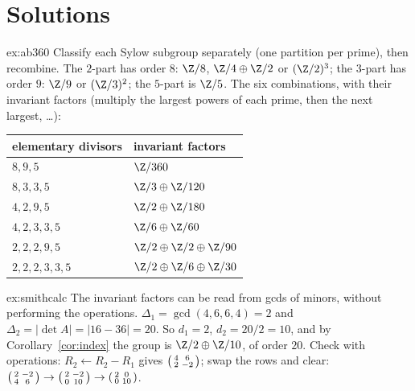 \section{Solutions}

\begin{solution}{ex:ab360}
\idea Classify each Sylow subgroup separately (one partition per prime), then recombine.
\writeup The $2$-part has order $8$: $\Z/8$, $\Z/4\oplus\Z/2$ or $(\Z/2)^3$; the $3$-part has order $9$: $\Z/9$ or $(\Z/3)^2$; the $5$-part is $\Z/5$. The six combinations, with their invariant factors (multiply the largest powers of each prime, then the next largest, \dots):
\begin{center}
\small
\begin{tabular}{ll}
elementary divisors & invariant factors\\\hline
$8,9,5$ & $\Z/360$\\
$8,3,3,5$ & $\Z/3\oplus\Z/120$\\
$4,2,9,5$ & $\Z/2\oplus\Z/180$\\
$4,2,3,3,5$ & $\Z/6\oplus\Z/60$\\
$2,2,2,9,5$ & $\Z/2\oplus\Z/2\oplus\Z/90$\\
$2,2,2,3,3,5$ & $\Z/2\oplus\Z/6\oplus\Z/30$
\end{tabular}
\end{center}
\end{solution}

\begin{solution}{ex:smithcalc}
\idea The invariant factors can be read from gcds of minors, without performing the operations.
\writeup $\Delta_1=\gcd(4,6,6,4)=2$ and $\Delta_2=|\det A|=|16-36|=20$. So $d_1=2$, $d_2=20/2=10$, and by Corollary~\ref{cor:index} the group is $\Z/2\oplus\Z/10$, of order $20$. Check with operations: $R_2\leftarrow R_2-R_1$ gives $\begin{psmallmatrix}4&6\\2&-2\end{psmallmatrix}$; swap the rows and clear: $\begin{psmallmatrix}2&-2\\4&6\end{psmallmatrix}\to\begin{psmallmatrix}2&-2\\0&10\end{psmallmatrix}\to\begin{psmallmatrix}2&0\\0&10\end{psmallmatrix}$.
\end{solution}

